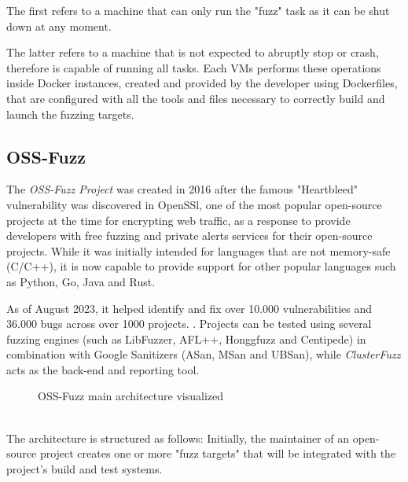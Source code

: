 The first refers to a machine that can only run the "fuzz" task as it can be shut down at any moment.

The latter refers to a machine that is not expected to abruptly stop or crash, therefore is capable of running all tasks.
Each VMs performs these operations inside Docker instances, created and provided by the developer using Dockerfiles, that are configured with all the tools and files necessary to correctly build and launch the fuzzing targets.


\subsection{OSS-Fuzz}
The \textit{OSS-Fuzz Project} \cite{ossfuzz_paper} was created in 2016 after the famous "Heartbleed" vulnerability was discovered in OpenSSl, one of the most popular open-source projects at the time for encrypting web traffic, as a response to provide developers with free fuzzing and private alerts services for their open-source projects.
While it was initially intended for languages that are not memory-safe (C/C++), it is now capable to provide support for other popular languages such as Python, Go, Java and Rust.  

As of August 2023, it helped identify and fix over 10.000 vulnerabilities and 36.000 bugs across over 1000 projects. \cite{ossfuzz_docs}.
Projects can be tested using several fuzzing engines (such as LibFuzzer, AFL++, Honggfuzz and Centipede) in combination with Google Sanitizers (ASan, MSan and UBSan), while \textit{ClusterFuzz} acts as the back-end and reporting tool.

\begin{figure}[h]
\caption{OSS-Fuzz main architecture visualized \cite{ossfuzz_docs}}
\label{fig:ossfuzz_architecture}
\end{figure}
\ \\
The architecture is structured as follows:
Initially, the maintainer of an open-source project creates one or more "fuzz targets" that will be integrated with the project's build and test systems. \cite{libfuzzer_docs}

